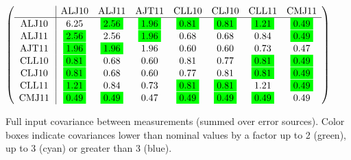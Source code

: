 \begin{table}[H]
\scriptsize
\begin{center}
\renewcommand{\arraystretch}{1.1}
\begin{math}\left(\begin{array}{c|ccccccc}
 & \mathrm{ALJ10} & 
\mathrm{ALJ11} & 
\mathrm{AJT11} & 
\mathrm{CLL10} & 
\mathrm{CLJ10} & 
\mathrm{CLL11} & 
\mathrm{CMJ11} \\
\hline
\mathrm{ALJ10} \hspace*{2pt} &       6.25 &  \colorbox{Green1}{$      2.56$} &  \colorbox{Green1}{$      1.96$} &  \colorbox{Green1}{$      0.81$} &  \colorbox{Green1}{$      0.81$} &  \colorbox{Green1}{$      1.21$} &  \colorbox{Green1}{$      0.49$} \\
\mathrm{ALJ11} \hspace*{2pt} &  \colorbox{Green1}{$      2.56$} &       2.56 &  \colorbox{Green1}{$      1.96$} &       0.68 &       0.68 &       0.84 &  \colorbox{Green1}{$      0.49$} \\
\mathrm{AJT11} \hspace*{2pt} &  \colorbox{Green1}{$      1.96$} &  \colorbox{Green1}{$      1.96$} &       1.96 &       0.60 &       0.60 &       0.73 &       0.47 \\
\mathrm{CLL10} \hspace*{2pt} &  \colorbox{Green1}{$      0.81$} &       0.68 &       0.60 &       0.81 &       0.77 &  \colorbox{Green1}{$      0.81$} &  \colorbox{Green1}{$      0.49$} \\
\mathrm{CLJ10} \hspace*{2pt} &  \colorbox{Green1}{$      0.81$} &       0.68 &       0.60 &       0.77 &       0.81 &  \colorbox{Green1}{$      0.81$} &  \colorbox{Green1}{$      0.49$} \\
\mathrm{CLL11} \hspace*{2pt} &  \colorbox{Green1}{$      1.21$} &       0.84 &       0.73 &  \colorbox{Green1}{$      0.81$} &  \colorbox{Green1}{$      0.81$} &       1.21 &  \colorbox{Green1}{$      0.49$} \\
\mathrm{CMJ11} \hspace*{2pt} &  \colorbox{Green1}{$      0.49$} &  \colorbox{Green1}{$      0.49$} &       0.47 &  \colorbox{Green1}{$      0.49$} &  \colorbox{Green1}{$      0.49$} &  \colorbox{Green1}{$      0.49$} &       0.49 \\
\end{array}\right)\end{math}
\caption{Full input covariance between measurements (summed over error sources). Color boxes indicate covariances lower than nominal values by a factor up to 2 (green), up to 3 (cyan) or greater than 3 (blue).}
\renewcommand{\arraystretch}{1}
\end{center}
\end{table}
